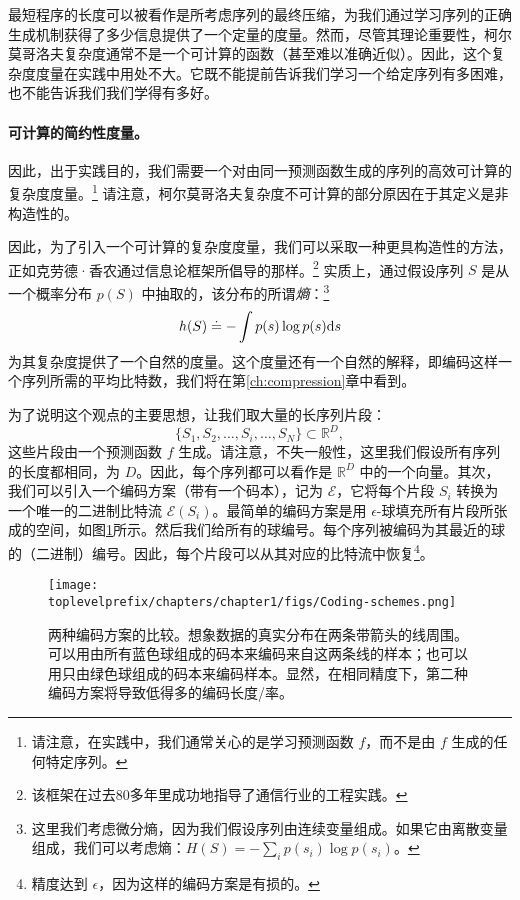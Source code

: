 \documentclass[../../book-main_zh.tex]{subfiles}
\begin{document}
最短程序的长度可以被看作是所考虑序列的最终压缩，为我们通过学习序列的正确生成机制获得了多少信息提供了一个定量的度量。然而，尽管其理论重要性，柯尔莫哥洛夫复杂度通常不是一个可计算的函数\cite{Cover-Thomas}（甚至难以准确近似）。因此，这个复杂度度量在实践中用处不大。它既不能提前告诉我们学习一个给定序列有多困难，也不能告诉我们我们学得有多好。






\paragraph{可计算的简约性度量。}
因此，出于实践目的，我们需要一个对由同一预测函数生成的序列的高效可计算的复杂度度量。\footnote{请注意，在实践中，我们通常关心的是学习预测函数 $f$，而不是由 $f$ 生成的任何特定序列。} 请注意，柯尔莫哥洛夫复杂度不可计算的部分原因在于其定义是非构造性的。

因此，为了引入一个可计算的复杂度度量，我们可以采取一种更具构造性的方法，正如克劳德·香农通过信息论框架\cite{Shannon-1948,Cover-Thomas}所倡导的那样。\footnote{该框架在过去80多年里成功地指导了通信行业的工程实践。} 实质上，通过假设序列 $S$ 是从一个概率分布 $p(S)$ 中抽取的，该分布的所谓{\em 熵}：\footnote{这里我们考虑微分熵，因为我们假设序列由连续变量组成。如果它由离散变量组成，我们可以考虑熵：$H(S) = - \sum_{i}p(s_i) \log p(s_i)$。}
\begin{equation}
    h(S) \doteq -\int p(s) \log p(s) \mathrm{d}s
    \label{eqn:entropy-definition}
\end{equation}
为其复杂度提供了一个自然的度量。这个度量还有一个自然的解释，即编码这样一个序列所需的平均比特数，我们将在第\ref{ch:compression}章中看到。

为了说明这个观点的主要思想，让我们取大量的长序列片段：
\begin{equation}
    \{S_1, S_2, \ldots, S_i, \ldots, S_N\} \subset \mathbb{R}^D,
\end{equation}
这些片段由一个预测函数 $f$ 生成。请注意，不失一般性，这里我们假设所有序列的长度都相同，为 $D$。因此，每个序列都可以看作是 $\mathbb{R}^D$ 中的一个向量。其次，我们可以引入一个编码方案（带有一个码本），记为 $\mathcal E$，它将每个片段 $S_i$ 转换为一个唯一的二进制比特流 $\mathcal{E}(S_i)$。最简单的编码方案是用 $\epsilon$-球填充所有片段所张成的空间，如图\ref{fig:coding-schemes}所示。然后我们给所有的球编号。每个序列被编码为其最近的球的（二进制）编号。因此，每个片段可以从其对应的比特流中恢复\footnote{精度达到 $\epsilon$，因为这样的编码方案是有损的。}。
\begin{figure}
    \centering
    \texttt{[image: \\toplevelprefix/chapters/chapter1/figs/Coding-schemes.png]}
    \caption{两种编码方案的比较。想象数据的真实分布在两条带箭头的线周围。可以用由所有蓝色球组成的码本来编码来自这两条线的样本；也可以用只由绿色球组成的码本来编码样本。显然，在相同精度下，第二种编码方案将导致低得多的编码长度/率。}
    \label{fig:coding-schemes}
\end{figure}
\end{document}
